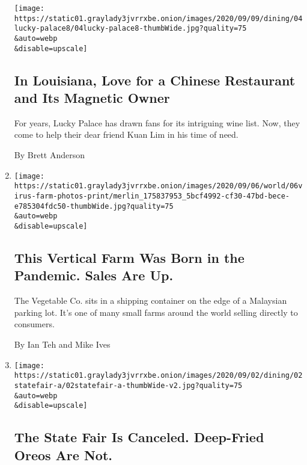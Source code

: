\begin{enumerate}
  \texttt{[image: https://static01.graylady3jvrrxbe.onion/images/2020/09/09/dining/04lucky-palace8/04lucky-palace8-thumbWide.jpg?quality=75\\\&auto=webp\\\&disable=upscale]}

  \hypertarget{in-louisiana-love-for-a-chinese-restaurant-and-its-magnetic-owner}{%
  \subsection{In Louisiana, Love for a Chinese Restaurant and Its
  Magnetic
  Owner}\label{in-louisiana-love-for-a-chinese-restaurant-and-its-magnetic-owner}}

  For years, Lucky Palace has drawn fans for its intriguing wine list.
  Now, they come to help their dear friend Kuan Lim in his time of need.

  By Brett Anderson
\item
  \href{/2020/09/03/world/asia/malaysia-vertical-farm-coronavirus.html}{}

  \texttt{[image: https://static01.graylady3jvrrxbe.onion/images/2020/09/06/world/06virus-farm-photos-print/merlin\_175837953\_5bcf4992-cf30-47bd-bece-e785304fdc50-thumbWide.jpg?quality=75\\\&auto=webp\\\&disable=upscale]}

  \hypertarget{this-vertical-farm-was-born-in-the-pandemic-sales-are-up}{%
  \subsection{This Vertical Farm Was Born in the Pandemic. Sales Are
  Up.}\label{this-vertical-farm-was-born-in-the-pandemic-sales-are-up}}

  The Vegetable Co. sits in a shipping container on the edge of a
  Malaysian parking lot. It's one of many small farms around the world
  selling directly to consumers.

  By Ian Teh and Mike Ives
\item
  \href{/2020/09/01/dining/state-fair-food-coronavirus.html}{}

  \texttt{[image: https://static01.graylady3jvrrxbe.onion/images/2020/09/02/dining/02statefair-a/02statefair-a-thumbWide-v2.jpg?quality=75\\\&auto=webp\\\&disable=upscale]}

  \hypertarget{the-state-fair-is-canceled-deep-fried-oreos-are-not}{%
  \subsection{The State Fair Is Canceled. Deep-Fried Oreos Are
  Not.}\label{the-state-fair-is-canceled-deep-fried-oreos-are-not}}


\end{enumerate}

